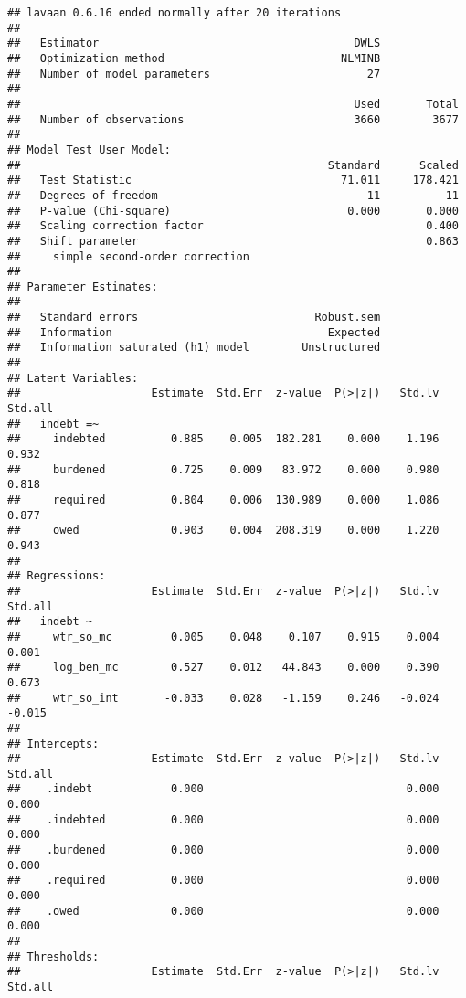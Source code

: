 \documentclass[
]{article}
\begin{document}
\begin{verbatim}
## lavaan 0.6.16 ended normally after 20 iterations
## 
##   Estimator                                       DWLS
##   Optimization method                           NLMINB
##   Number of model parameters                        27
## 
##                                                   Used       Total
##   Number of observations                          3660        3677
## 
## Model Test User Model:
##                                               Standard      Scaled
##   Test Statistic                                71.011     178.421
##   Degrees of freedom                                11          11
##   P-value (Chi-square)                           0.000       0.000
##   Scaling correction factor                                  0.400
##   Shift parameter                                            0.863
##     simple second-order correction                                
## 
## Parameter Estimates:
## 
##   Standard errors                           Robust.sem
##   Information                                 Expected
##   Information saturated (h1) model        Unstructured
## 
## Latent Variables:
##                    Estimate  Std.Err  z-value  P(>|z|)   Std.lv  Std.all
##   indebt =~                                                             
##     indebted          0.885    0.005  182.281    0.000    1.196    0.932
##     burdened          0.725    0.009   83.972    0.000    0.980    0.818
##     required          0.804    0.006  130.989    0.000    1.086    0.877
##     owed              0.903    0.004  208.319    0.000    1.220    0.943
## 
## Regressions:
##                    Estimate  Std.Err  z-value  P(>|z|)   Std.lv  Std.all
##   indebt ~                                                              
##     wtr_so_mc         0.005    0.048    0.107    0.915    0.004    0.001
##     log_ben_mc        0.527    0.012   44.843    0.000    0.390    0.673
##     wtr_so_int       -0.033    0.028   -1.159    0.246   -0.024   -0.015
## 
## Intercepts:
##                    Estimate  Std.Err  z-value  P(>|z|)   Std.lv  Std.all
##    .indebt            0.000                               0.000    0.000
##    .indebted          0.000                               0.000    0.000
##    .burdened          0.000                               0.000    0.000
##    .required          0.000                               0.000    0.000
##    .owed              0.000                               0.000    0.000
## 
## Thresholds:
##                    Estimate  Std.Err  z-value  P(>|z|)   Std.lv  Std.all

\end{verbatim}
\end{document}
